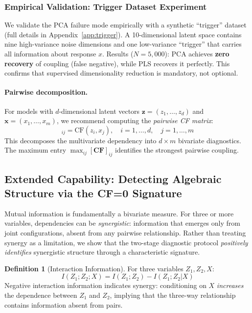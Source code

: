 \documentclass[10pt]{article} %
\theoremstyle{plain}
\theoremstyle{definition}
\newtheorem{definition}[theorem]{Definition}
\newcommand{\CF}{\mathrm{CF}}
\begin{document}
\subsubsection{Empirical Validation: Trigger Dataset Experiment}

We validate the PCA failure mode empirically with a synthetic ``trigger'' dataset (full details in Appendix~\ref{app:trigger}). A 10-dimensional latent space contains nine high-variance noise dimensions and one low-variance ``trigger'' that carries all information about response $x$. Results ($N = 5{,}000$): PCA achieves \textbf{zero recovery} of coupling (false negative), while PLS recovers it perfectly. This confirms that supervised dimensionality reduction is mandatory, not optional.

\paragraph{Pairwise decomposition.} For models with $d$-dimensional latent vectors $\mathbf{z} = (z_1, \ldots, z_d)$ and $\mathbf{x} = (x_1, \ldots, x_m)$, we recommend computing the \emph{pairwise CF matrix}:
\begin{equation}
[\mathbf{CF}]_{ij} = \CF(z_i, x_j), \quad i = 1, \ldots, d, \quad j = 1, \ldots, m
\end{equation}
This decomposes the multivariate dependency into $d \times m$ bivariate diagnostics. The maximum entry $\max_{ij} [\mathbf{CF}]_{ij}$ identifies the strongest pairwise coupling.

\subsection{Extended Capability: Detecting Algebraic Structure via the CF=0 Signature}
\label{sec:synergy}

Mutual information is fundamentally a bivariate measure. For three or more variables, dependencies can be \emph{synergistic}: information that emerges only from joint configurations, absent from any pairwise relationship. Rather than treating synergy as a limitation, we show that the two-stage diagnostic protocol \emph{positively identifies} synergistic structure through a characteristic signature.

\begin{definition}[Interaction Information]
For three variables $Z_1, Z_2, X$:
\begin{equation}
I(Z_1; Z_2; X) = I(Z_1; Z_2) - I(Z_1; Z_2 | X)
\end{equation}
Negative interaction information indicates synergy: conditioning on $X$ \emph{increases} the dependence between $Z_1$ and $Z_2$, implying that the three-way relationship contains information absent from pairs.
\end{definition}
\end{document}
